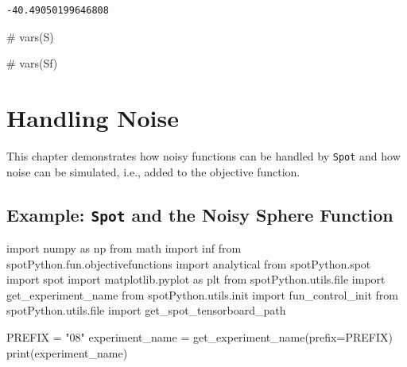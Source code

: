 \documentclass[
  letterpaper,
  DIV=11,
  numbers=noendperiod]{scrreprt}
\newenvironment{Shaded}{\begin{snugshade}}{\end{snugshade}}
\newcommand{\BuiltInTok}[1]{\textcolor[rgb]{0.00,0.23,0.31}{#1}}
\newcommand{\CommentTok}[1]{\textcolor[rgb]{0.37,0.37,0.37}{#1}}
\newcommand{\ImportTok}[1]{\textcolor[rgb]{0.00,0.46,0.62}{#1}}
\newcommand{\NormalTok}[1]{\textcolor[rgb]{0.00,0.23,0.31}{#1}}
\newcommand{\OperatorTok}[1]{\textcolor[rgb]{0.37,0.37,0.37}{#1}}
\newcommand{\StringTok}[1]{\textcolor[rgb]{0.13,0.47,0.30}{#1}}
\begin{document}
\begin{verbatim}
-40.49050199646808
\end{verbatim}

\begin{Shaded}
\begin{Highlighting}[]
\CommentTok{\# vars(S)}
\end{Highlighting}
\end{Shaded}

\begin{Shaded}
\begin{Highlighting}[]
\CommentTok{\# vars(Sf)}
\end{Highlighting}
\end{Shaded}

\hypertarget{sec-noise}{%
\chapter{Handling Noise}\label{sec-noise}}

This chapter demonstrates how noisy functions can be handled by
\texttt{Spot} and how noise can be simulated, i.e., added to the
objective function.

\hypertarget{example-spot-and-the-noisy-sphere-function}{%
\section{\texorpdfstring{Example: \texttt{Spot} and the Noisy Sphere
Function}{Example: Spot and the Noisy Sphere Function}}\label{example-spot-and-the-noisy-sphere-function}}

\begin{Shaded}
\begin{Highlighting}[]
\ImportTok{import}\NormalTok{ numpy }\ImportTok{as}\NormalTok{ np}
\ImportTok{from}\NormalTok{ math }\ImportTok{import}\NormalTok{ inf}
\ImportTok{from}\NormalTok{ spotPython.fun.objectivefunctions }\ImportTok{import}\NormalTok{ analytical}
\ImportTok{from}\NormalTok{ spotPython.spot }\ImportTok{import}\NormalTok{ spot}
\ImportTok{import}\NormalTok{ matplotlib.pyplot }\ImportTok{as}\NormalTok{ plt}
\ImportTok{from}\NormalTok{ spotPython.utils.}\BuiltInTok{file} \ImportTok{import}\NormalTok{ get\_experiment\_name}
\ImportTok{from}\NormalTok{ spotPython.utils.init }\ImportTok{import}\NormalTok{ fun\_control\_init}
\ImportTok{from}\NormalTok{ spotPython.utils.}\BuiltInTok{file} \ImportTok{import}\NormalTok{ get\_spot\_tensorboard\_path}

\NormalTok{PREFIX }\OperatorTok{=} \StringTok{"08"}
\NormalTok{experiment\_name }\OperatorTok{=}\NormalTok{ get\_experiment\_name(prefix}\OperatorTok{=}\NormalTok{PREFIX)}
\BuiltInTok{print}\NormalTok{(experiment\_name)}
\end{Highlighting}
\end{Shaded}
\end{document}
